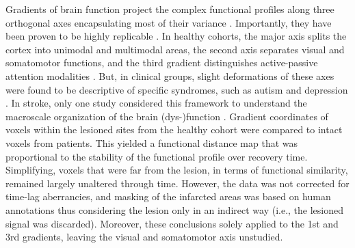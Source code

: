 \documentclass[fleqn,10pt]{wlscirep}
\begin{document}
Gradients of brain function project the complex functional profiles along three orthogonal axes encapsulating most of their variance \citep{vos2020brainspace}. Importantly, they have been proven to be highly replicable \citep{margulies2016situating,bethlehem2020dispersion,mckeown2020relationship,hardikar2022macro}. In healthy cohorts, the major axis splits the cortex into unimodal and multimodal areas, the second axis separates visual and somatomotor functions, and the third gradient distinguishes active-passive attention modalities \citep{Glasser_2016}. But, in clinical groups, slight deformations of these axes were found to be descriptive of specific syndromes, such as autism \citep{hong2019atypical} and depression \citep{xia2022connectome}. In stroke, only one study considered this framework to understand the macroscale organization of the brain (dys-)function \citep{bayrak2019impact}. Gradient coordinates of voxels within the lesioned sites from the healthy cohort were compared to intact voxels from patients. This yielded a functional distance map that was proportional to the stability of the functional profile over recovery time. Simplifying, voxels that were far from the lesion, in terms of functional similarity, remained largely unaltered through time. However, the data was not corrected for time-lag aberrancies, and masking of the infarcted areas was based on human annotations thus considering the lesion only in an indirect way (i.e., the lesioned signal was discarded). Moreover, these conclusions solely applied to the 1st and 3rd gradients, leaving the visual and somatomotor axis unstudied. 
\end{document}
